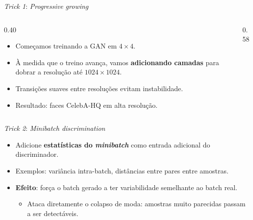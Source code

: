 \documentclass[aspectratio=169,xcolor=dvipsnames]{beamer}
\begin{document}
  \begin{frame}{\textit{Trick 1}: \textit{Progressive growing}}
    \begin{columns}[T]
      \begin{column}{0.40\textwidth}
        \begin{itemize}
          \item Começamos treinando a GAN em $4{\times}4$.
          \item À medida que o treino avança, vamos \textbf{adicionando
          camadas} para dobrar a resolução até $1024{\times}1024$.
          \item Transições suaves entre resoluções evitam instabilidade.
          \item Resultado: faces CelebA-HQ em alta resolução.
        \end{itemize}
      \end{column}
      \begin{column}{0.58\textwidth}
        \centering
        \resizebox{\linewidth}{!}{\progressivegrowingfigure}
      \end{column}
    \end{columns}
  \end{frame}

  \begin{frame}{\textit{Trick 2}: \textit{Minibatch discrimination}}
    \begin{itemize}
      \item Adicione \textbf{estatísticas do \textit{minibatch}} como
      entrada adicional do discriminador.
      \item Exemplos: variância intra-batch, distâncias entre pares entre
      amostras.
      \item \textbf{Efeito}: força o batch gerado a ter variabilidade
      semelhante ao batch real.
      \begin{itemize}
        \item Ataca diretamente o colapso de moda: amostras muito
        parecidas passam a ser detectáveis.
      \end{itemize}
    \end{itemize}
  \end{frame}
\end{document}
